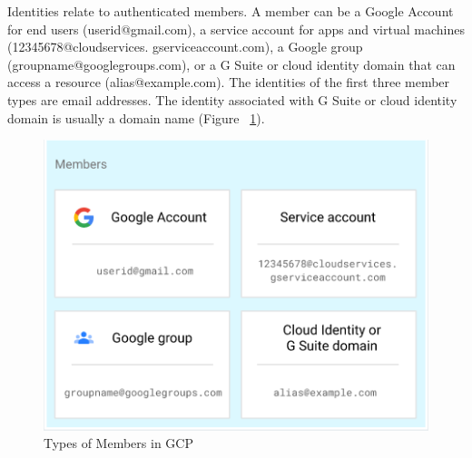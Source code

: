 \documentclass[sigconf]{acmart}
\begin{document}
Identities relate to authenticated members. A member can be a Google Account for end users (userid@gmail.com), a service account for apps and virtual machines (12345678@cloudservices.
gserviceaccount.com), a Google group (groupname@googlegroups.com), or a G Suite or cloud identity domain that can access a resource (alias@example.com). The identities of the first three member types are email addresses. The identity associated with G Suite or cloud identity domain is usually a domain name (Figure ~\ref{fig:mem}).
\begin{figure}[h]
  \centering
  \includegraphics[width=\linewidth]{mem}
  \caption {Types of Members in GCP}
  \label{fig:mem}
\end{figure}
\end{document}

